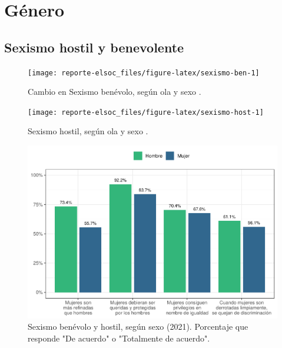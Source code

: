 \documentclass[
  12pt,
  openany]{book}
\begin{document}
\hypertarget{guxe9nero}{%
\chapter{Género}\label{guxe9nero}}

\hypertarget{sexismo-hostil-y-benevolente}{%
\section{Sexismo hostil y benevolente}\label{sexismo-hostil-y-benevolente}}

\begin{figure}

{\centering \texttt{[image: reporte-elsoc\_files/figure-latex/sexismo-ben-1]} 

}

\caption{Cambio en Sexismo benévolo, según ola y sexo .}\label{fig:sexismo-ben}
\end{figure}

\begin{figure}

{\centering \texttt{[image: reporte-elsoc\_files/figure-latex/sexismo-host-1]} 

}

\caption{Sexismo hostil, según ola y sexo .}\label{fig:sexismo-host}
\end{figure}

\begin{figure}

{\centering \includegraphics{reporte-elsoc_files/figure-latex/sexismo-sexo-1} 

}

\caption{Sexismo benévolo y hostil, según sexo (2021). Porcentaje que responde "De acuerdo" o "Totalmente de acuerdo".}\label{fig:sexismo-sexo}
\end{figure}
\end{document}
